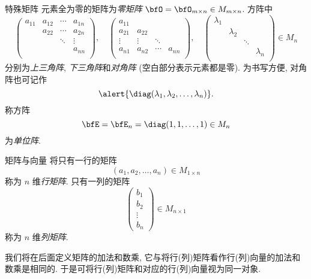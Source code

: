 \begin{frame}{特殊矩阵}
	\onslide<+->
	元素全为零的矩阵为\emph{零矩阵} $\bfO=\bfO_{m\times n}\in M_{m\times n}$.
	\onslide<+->
	方阵中
	\[\begin{pmatrix}
		a_{11}&a_{12}&\cdots&a_{1n}\\
		&a_{22}&\cdots&a_{2n}\\
		&&\ddots&\vdots\\
		&&&a_{nn}\\
	\end{pmatrix},\quad\begin{pmatrix}
		a_{11}&&&\\
		a_{21}&a_{22}&&\\
		\vdots&\vdots&\ddots&\\
		a_{n1}&a_{n2}&\cdots&a_{nn}\\
	\end{pmatrix},\quad\begin{pmatrix}
		\lambda_1&&&\\
		&\lambda_2&&\\
		&&\ddots&\\
		&&&\lambda_n\\
	\end{pmatrix}\in M_n\]
	分别为\emph{上三角阵}, \emph{下三角阵}和\emph{对角阵} (空白部分表示元素都是零).
	\onslide<+->
	为书写方便, 对角阵也可记作
	\[\alert{\diag(\lambda_1,\lambda_2,\dots,\lambda_n)}.\]
	\onslide<+->
	称方阵
	\[\bfE=\bfE_n=\diag(1,1,\dots,1)\in M_n\]
	为\emph{单位阵}.
\end{frame}


\begin{frame}{矩阵与向量}
	\onslide<+->
	将只有一行的矩阵
	\[(a_1,a_2,\dots,a_n)\in M_{1\times n}\]
	称为 $n$ 维\emph{行矩阵}.
	\onslide<+->
	只有一列的矩阵
	\[\begin{pmatrix}
		b_1\\b_2\\\vdots\\b_n
	\end{pmatrix}\in M_{n\times 1}\]
	称为 $n$ 维\emph{列矩阵}.

	\onslide<+->
	我们将在后面定义矩阵的加法和数乘, 它与将行(列)矩阵看作行(列)向量的加法和数乘是相同的.
	\onslide<+->
	于是可将行(列)矩阵和对应的行(列)向量视为同一对象.
\end{frame}


